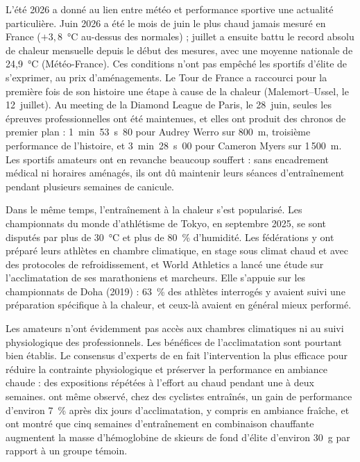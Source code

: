 \documentclass[11pt,a4paper]{article}
\begin{document}
L'été 2026 a donné au lien entre météo et performance sportive une actualité particulière. Juin 2026 a été le mois
de juin le plus chaud jamais mesuré en France ($+3{,}8$~°C au-dessus des normales) ; juillet a ensuite battu le record
absolu de chaleur mensuelle depuis le début des mesures, avec une moyenne nationale de 24,9~°C (Météo-France). Ces
conditions n'ont pas empêché les sportifs d'élite de s'exprimer, au prix d'aménagements. Le Tour de France a raccourci
pour la première fois de son histoire une étape à cause de la chaleur (Malemort--Ussel, le 12~juillet). Au meeting de
la Diamond League de Paris, le 28~juin, seules les épreuves professionnelles ont été maintenues, et elles ont produit
des chronos de premier plan : 1~min~53~s~80 pour Audrey Werro sur 800~m, troisième performance de l'histoire, et
3~min~28~s~00 pour Cameron Myers sur 1\,500~m. Les sportifs amateurs ont en revanche beaucoup souffert : sans
encadrement médical ni horaires aménagés, ils ont dû maintenir leurs séances d'entraînement pendant plusieurs semaines
de canicule.

Dans le même temps, l'entraînement à la chaleur s'est popularisé. Les championnats du monde d'athlétisme de Tokyo, en
septembre 2025, se sont disputés par plus de 30~°C et plus de 80~\% d'humidité. Les fédérations y ont préparé leurs
athlètes en chambre climatique, en stage sous climat chaud et avec des protocoles de refroidissement, et World
Athletics a lancé une étude sur l'acclimatation de ses marathoniens et marcheurs. Elle s'appuie sur les championnats
de Doha (2019) : 63~\% des athlètes interrogés y avaient suivi une préparation spécifique à la chaleur, et ceux-là
avaient en général mieux performé.

Les amateurs n'ont évidemment pas accès aux chambres climatiques ni au suivi physiologique des professionnels. Les
bénéfices de l'acclimatation sont pourtant bien établis. Le consensus d'experts de \citet{racinais2015} en fait
l'intervention la plus efficace pour réduire la contrainte physiologique et préserver la performance en ambiance
chaude : des expositions répétées à l'effort au chaud pendant une à deux semaines. \citet{lorenzo2010} ont même
observé, chez des cyclistes entraînés, un gain de performance d'environ 7~\% après dix jours d'acclimatation, y
compris en ambiance fraîche, et \citet{ronnestad2022} ont montré que cinq semaines d'entraînement en combinaison
chauffante augmentent la masse d'hémoglobine de skieurs de fond d'élite d'environ 30~g par rapport à un groupe
témoin.
\end{document}
